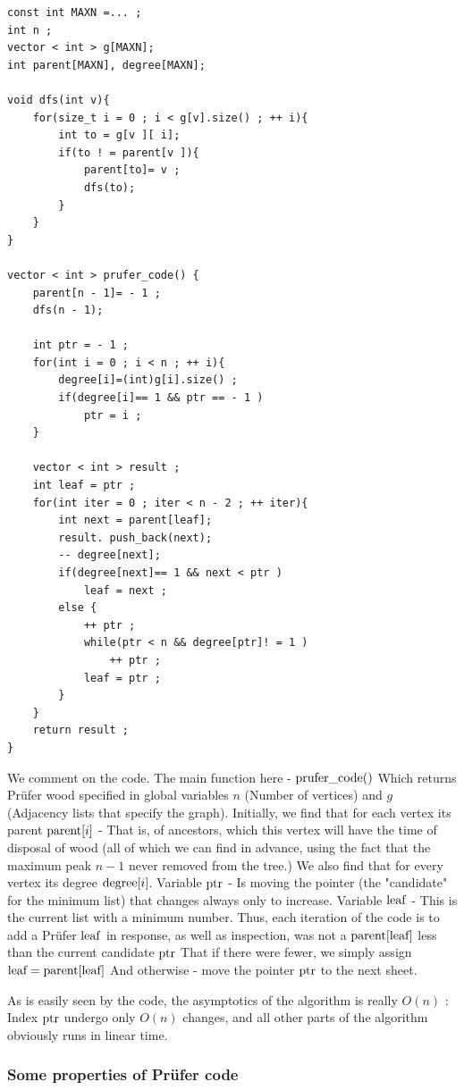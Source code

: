 \begin{verbatim}
const int MAXN =... ;
int n ;
vector < int > g[MAXN];
int parent[MAXN], degree[MAXN];
 
void dfs(int v){
    for(size_t i = 0 ; i < g[v].size() ; ++ i){
        int to = g[v ][ i];
        if(to ! = parent[v ]){
            parent[to]= v ;
            dfs(to);
        }
    }
}
 
vector < int > prufer_code() {
    parent[n - 1]= - 1 ;
    dfs(n - 1);
 
    int ptr = - 1 ;
    for(int i = 0 ; i < n ; ++ i){
        degree[i]=(int)g[i].size() ;
        if(degree[i]== 1 && ptr == - 1 )
            ptr = i ;
    }
 
    vector < int > result ;
    int leaf = ptr ;
    for(int iter = 0 ; iter < n - 2 ; ++ iter){
        int next = parent[leaf];
        result. push_back(next);
        -- degree[next];
        if(degree[next]== 1 && next < ptr )
            leaf = next ;
        else {
            ++ ptr ;
            while(ptr < n && degree[ptr]! = 1 )
                ++ ptr ;
            leaf = ptr ;
        }
    }
    return result ;
} 
\end{verbatim}
We comment on the code. The main function here - $\rm prufer \_code()$ Which returns Prüfer wood specified in global variables $n$ (Number of vertices) and $g$ (Adjacency lists that specify the graph). Initially, we find that for each vertex its parent ${\rm parent} [i]$ - That is, of ancestors, which this vertex will have the time of disposal of wood (all of which we can find in advance, using the fact that the maximum peak $n-1$ never removed from the tree.) We also find that for every vertex its degree ${\rm degree} [i]$. Variable $\rm ptr$ - Is moving the pointer (the "candidate" for the minimum list) that changes always only to increase. Variable $\rm leaf$ - This is the current list with a minimum number. Thus, each iteration of the code is to add a Prüfer $\rm leaf$ in response, as well as inspection, was not a $\rm parent [leaf]$ less than the current candidate $\rm ptr$ That if there were fewer, we simply assign $\rm leaf = parent [leaf]$ And otherwise - move the pointer $\rm ptr$ to the next sheet.

As is easily seen by the code, the asymptotics of the algorithm is really $O (n)$ : Index $\rm ptr$ undergo only $O (n)$ changes, and all other parts of the algorithm obviously runs in linear time.

\subsubsection{ Some properties of Prüfer code }

